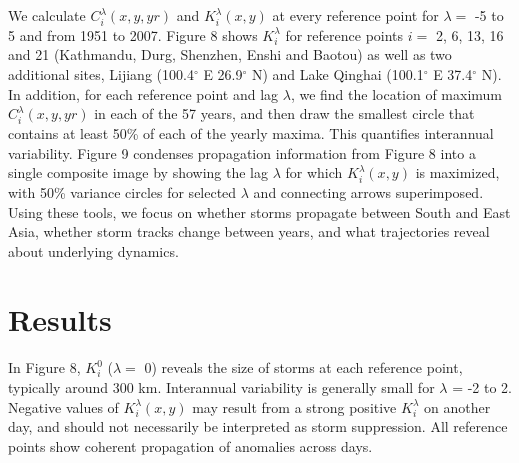 	We calculate $C_i^\lambda(x,y,yr)$ and $K_i^\lambda(x,y)$ at every reference point for $\lambda =$ -5 to 5 and from 1951 to 2007. Figure 8 shows $K_i^\lambda$ for reference points $i=$ 2, 6, 13, 16 and 21 (Kathmandu, Durg, Shenzhen, Enshi and Baotou) as well as two additional sites, Lijiang (100.4$^{\circ}$ E 26.9$^{\circ}$ N) and Lake Qinghai (100.1$^{\circ}$ E 37.4$^{\circ}$ N). In addition, for each reference point and lag $\lambda$, we find the location of maximum $C_i^\lambda(x,y,yr)$ in each of the 57 years, and then draw the smallest circle that contains at least 50\% of each of the yearly maxima. This quantifies interannual variability. Figure 9 condenses propagation information from Figure 8 into a single composite image by showing the lag $\lambda$ for which $K_i^\lambda(x,y)$ is maximized, with 50\% variance circles for selected $\lambda$ and connecting arrows superimposed. Using these tools, we focus on whether storms propagate between South and East Asia, whether storm tracks change between years, and what trajectories reveal about underlying dynamics.
	
\section{Results}	
		 	 		
	 In Figure 8, $K_i^0$ ($\lambda =$ 0) reveals the size of storms at each reference point, typically around 300 km. Interannual variability is generally small for $\lambda$ = -2 to 2. Negative values of $K_i^\lambda(x,y)$ may result from a strong positive $K_i^{\lambda}$  on another day, and should not necessarily be interpreted as storm suppression. All reference points show coherent propagation of anomalies across days. 
	 
